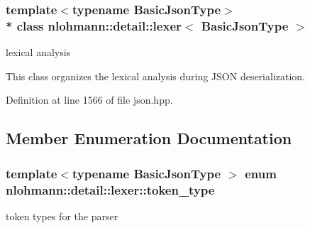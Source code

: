 \subsubsection*{template$<$typename Basic\+Json\+Type$>$\\*
class nlohmann\+::detail\+::lexer$<$ Basic\+Json\+Type $>$}

lexical analysis 

This class organizes the lexical analysis during J\+S\+ON deserialization. 

Definition at line 1566 of file json.\+hpp.



\subsection{Member Enumeration Documentation}
\subsubsection[{\texorpdfstring{token\+\_\+type}{token_type}}]{\setlength{\rightskip}{0pt plus 5cm}template$<$typename Basic\+Json\+Type $>$ enum {\bf nlohmann\+::detail\+::lexer\+::token\+\_\+type}\hspace{0.3cm}{\ttfamily [strong]}}\hypertarget{classnlohmann_1_1detail_1_1lexer_a3f313cdbe187cababfc5e06f0b69b098}{}\label{classnlohmann_1_1detail_1_1lexer_a3f313cdbe187cababfc5e06f0b69b098}


token types for the parser 

